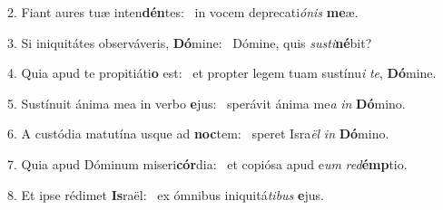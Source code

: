 2. Fiant aures tuæ inten\textbf{dén}tes: \ast\  in vocem deprecati\textit{ó}\textit{nis} \textbf{me}æ.\

3. Si iniquitátes observáveris, \textbf{Dó}mine: \ast\  Dómine, quis \textit{sus}\textit{ti}\textbf{né}bit?\

4. Quia apud te propitiáti\textbf{o} est: \ast\  et propter legem tuam sustínu\textit{i} \textit{te}, \textbf{Dó}mine.\

5. Sustínuit ánima mea in verbo \textbf{e}jus: \ast\  sperávit ánima me\textit{a} \textit{in} \textbf{Dó}mino.\

6. A custódia matutína usque ad \textbf{noc}tem: \ast\  speret Isra\textit{ël} \textit{in} \textbf{Dó}mino.\

7. Quia apud Dóminum miseri\textbf{cór}dia: \ast\  et copiósa apud e\textit{um} \textit{red}\textbf{émp}tio.\

8. Et ipse rédimet \textbf{Is}raël: \ast\  ex ómnibus iniquitá\textit{ti}\textit{bus} \textbf{e}jus.\

